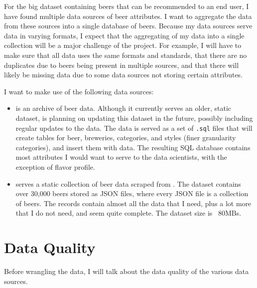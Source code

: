\documentclass[sigconf, natbib=true]{acmart}
\begin{document}
For the big dataset containing beers that can be recommended to an end user, I have found multiple data sources of beer attributes.
I want to aggregate the data from these sources into a single database of beers. 
Because my data sources serve data in varying formats, I expect that the aggregating of my data into a single collection will be a major challenge of the project.
For example, I will have to make sure that all data uses the same formats and standards, that there are no duplicates due to beers being present in multiple sources, and that there will likely be missing data due to some data sources not storing certain attributes.

I want to make use of the following data sources:
\begin{itemize}
    \item \citet{openbeerdb} is an archive of beer data.
    Although it currently serves an older, static dataset, \citeauthor{openbeerdb} is planning on updating this dataset in the future, possibly including regular updates to the data.
    The \citeauthor{openbeerdb} data is served as a set of \texttt{.sql} files that will create tables for beer, breweries, categories, and styles (finer granularity categories), and insert them with data.
    The resulting SQL database contains most attributes I would want to serve to the data scientists, with the exception of flavor profile.
    \item \citet{philipperemy} serves a static collection of beer data scraped from \citet{brewerydb}.
    The dataset contains over 30,000 beers stored as JSON files, where every JSON file is a collection of beers.
    The records contain almost all the data that I need, plus a lot more that I do not need, and seem quite complete.
    The dataset size is ~80MBs.
\end{itemize}

\section{Data Quality}
Before wrangling the data, I will talk about the data quality of the various data sources.
\end{document}
